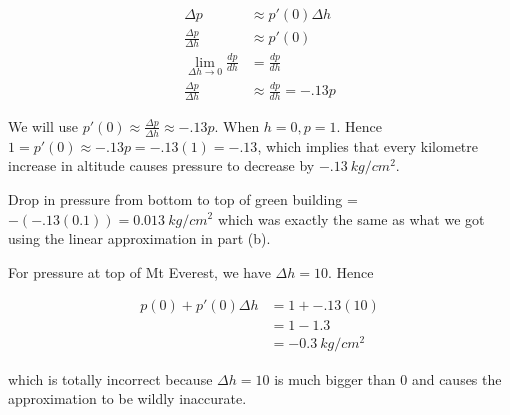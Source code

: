\documentclass[9pt]{article}
\begin{document}
\begin{align*}
  \Delta p &\approx p'(0)\Delta h\\
  \frac{\Delta p}{\Delta h} &\approx p'(0)\\
  \lim_{\Delta h \rightarrow 0} \frac{dp}{dh} &= \frac{dp}{dh}\\
  \frac{\Delta p}{\Delta h} &\approx \frac{dp}{dh} = -.13p
\end{align*}

We will use $p'(0) \approx \frac{\Delta p}{\Delta h} \approx -.13p$. When $h = 0, p = 1$. Hence $1 = p'(0) \approx -.13p = -.13(1) = -.13$, which implies that every kilometre increase in altitude causes pressure to decrease by $-.13\ kg/cm^2$.

Drop in pressure from bottom to top of green building = $-(-.13(0.1)) = 0.013\ kg/cm^2$ which was exactly the same as what we got using the linear approximation in part (b).

For pressure at top of Mt Everest, we have $\Delta h = 10$. Hence

\begin{align*}
  p(0) + p'(0)\Delta h &= 1 + -.13(10)\\
                       &= 1 - 1.3\\
                       &= -0.3\ kg/cm^2
\end{align*}

which is totally incorrect because $\Delta h = 10$ is much bigger than $0$ and causes the approximation to be wildly inaccurate.
\end{document}

